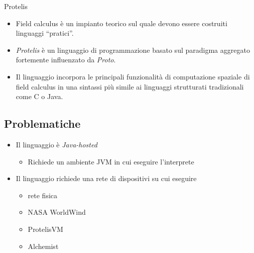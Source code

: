 \documentclass[
  usepdftitle=false,  %
  bigger,               %
  lualatex,           %
  italian             %
]{beamer}
\begin{document}
    \begin{frame}{\insertsectionhead}{\insertsubsectionhead}


      \begin{block}{Protelis}
        \begin{itemize}[<+->]
          \item Field calculus è un impianto teorico sul quale devono essere costruiti linguaggi ``pratici''.
          \item \emph{Protelis} è un linguaggio di programmazione basato sul paradigma aggregato fortemente influenzato da \emph{Proto}.
          \item Il linguaggio incorpora le principali funzionalità di computazione spaziale di field calculus in una sintassi più simile ai linguaggi strutturati tradizionali come C o Java.
        \end{itemize}
      \end{block}
    \end{frame}

    \subsection{Problematiche}

    \begin{frame}{\insertsectionhead}{\insertsubsectionhead}

      \begin{block}{\insertsubsectionhead}
        \begin{itemize}[<+->]
          \item
            Il linguaggio è \emph{Java-hosted}
            \begin{itemize}
              \item Richiede un ambiente JVM in cui eseguire l'interprete
            \end{itemize}
          \item
            Il linguaggio richiede una rete di dispositivi su cui eseguire
            \begin{itemize}[<+->]
              \item rete fisica
              \item NASA WorldWind  %
              \item ProtelisVM      %
              \item Alchemist       %
            \end{itemize}
        \end{itemize}
      \end{block}
    \end{frame}
\end{document}
